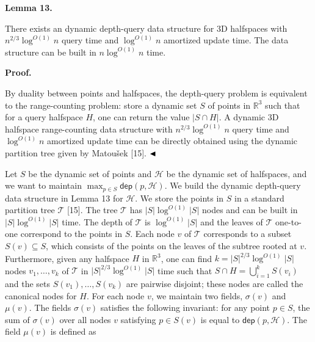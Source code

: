 \documentclass[10pt,a4paper]{article}
\begin{document}
\par
\par
\par\medskip\noindent\textbf{Lemma 13.}\par
There exists an dynamic depth-query data structure for 3D halfspaces with $n^{2/3}\log^{O(1)}n$ query time and $\log^{O(1)}n$ amortized update time. The data structure can be built in $n\log^{O(1)}n$ time.
\par
\par
\par
\par\medskip\noindent\textbf{Proof.}\par
By duality between points and halfspaces, the depth-query problem is equivalent to the range-counting problem: store a dynamic set $S$ of points in $\mathbb{R}^{3}$ such that for a query halfspace $H$, one can return the value $|S\cap H|$. A dynamic 3D halfspace range-counting data structure with $n^{2/3}\log^{O(1)}n$ query time and $\log^{O(1)}n$ amortized update time can be directly obtained using the dynamic partition tree given by Matoušek [15]. $\hfill\blacktriangleleft$
\par
\par
Let $S$ be the dynamic set of points and $\mathcal{H}$ be the dynamic set of halfspaces, and we want to maintain $\max_{p\in S}\mathsf{dep}(p,\mathcal{H})$. We build the dynamic depth-query data structure in Lemma 13 for $\mathcal{H}$. We store the points in $S$ in a standard partition tree $\mathcal{T}$ [15]. The tree $\mathcal{T}$ has $|S|\log^{O(1)}|S|$ nodes and can be built in $|S|\log^{O(1)}|S|$ time. The depth of $\mathcal{T}$ is $\log^{O(1)}|S|$ and the leaves of $\mathcal{T}$ one-to-one correspond to the points in $S$. Each node $v$ of $\mathcal{T}$ corresponds to a subset $S(v)\subseteq S$, which consists of the points on the leaves of the subtree rooted at $v$. Furthermore, given any halfspace $H$ in $\mathbb{R}^{3}$, one can find $k=|S|^{2/3}\log^{O(1)}|S|$ nodes $v_{1},\dots,v_{k}$ of $\mathcal{T}$ in $|S|^{2/3}\log^{O(1)}|S|$ time such that $S\cap H=\bigcup_{i=1}^{k}S(v_{i})$ and the sets $S(v_{1}),\dots,S(v_{k})$ are pairwise disjoint; these nodes are called the canonical nodes for $H$. For each node $v$, we maintain two fields, $\sigma(v)$ and $\mu(v)$. The fields $\sigma(v)$ satisfies the following invariant: for any point $p\in S$, the sum of $\sigma(v)$ over all nodes $v$ satisfying $p\in S(v)$ is equal to ${\mathsf{dep}}(p,\mathcal{H})$. The field $\mu(v)$ is defined as
\end{document}
